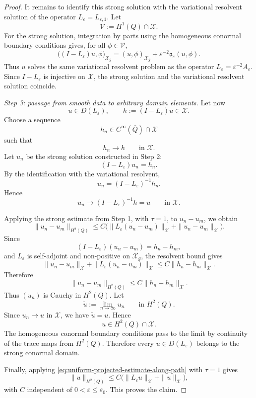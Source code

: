 \documentclass[11pt]{article}
\theoremstyle{definition}
\theoremstyle{remark}
\numberwithin{equation}{section}
\begin{document}
\begin{proof}
It remains to identify this strong solution with the variational resolvent
solution of the operator \(L_\varepsilon=L_{\varepsilon,1}\). Let
\[
\mathcal V:=H^1(Q)\cap\mathcal X .
\]
For the strong solution, integration by parts using the homogeneous conormal
boundary conditions gives, for all \(\phi\in\mathcal V\),
\[
\bigl((I-L_\varepsilon)u,\phi\bigr)_{\mathcal X_g}
=
(u,\phi)_{\mathcal X_g}
+
\varepsilon^{-2}\mathfrak a_\varepsilon(u,\phi).
\]
Thus \(u\) solves the same variational resolvent problem as the operator
\(L_\varepsilon=\varepsilon^{-2}A_\varepsilon\). Since \(I-L_\varepsilon\) is
injective on \(\mathcal X\), the strong solution and the variational
resolvent solution coincide.

\emph{Step 3: passage from smooth data to arbitrary domain elements.}
Let now
\[
u\in D(L_\varepsilon),
\qquad
h:=(I-L_\varepsilon)u\in\mathcal X.
\]
Choose a sequence
\[
h_n\in C^\infty(\overline Q)\cap\mathcal X
\]
such that
\[
h_n\to h
\qquad\text{in }\mathcal X.
\]
Let \(u_n\) be the strong solution constructed in Step 2:
\[
(I-L_\varepsilon)u_n=h_n.
\]
By the identification with the variational resolvent,
\[
u_n=(I-L_\varepsilon)^{-1}h_n.
\]
Hence
\[
u_n\to (I-L_\varepsilon)^{-1}h=u
\qquad\text{in }\mathcal X.
\]

Applying the strong estimate from Step 1, with \(\tau=1\), to
\(u_n-u_m\), we obtain
\[
\|u_n-u_m\|_{H^2(Q)}
\le
C\bigl(
\|L_\varepsilon(u_n-u_m)\|_{\mathcal X}
+
\|u_n-u_m\|_{\mathcal X}
\bigr).
\]
Since
\[
(I-L_\varepsilon)(u_n-u_m)=h_n-h_m,
\]
and \(L_\varepsilon\) is self-adjoint and non-positive on \(\mathcal X_g\),
the resolvent bound gives
\[
\|u_n-u_m\|_{\mathcal X}
+
\|L_\varepsilon(u_n-u_m)\|_{\mathcal X}
\le
C\|h_n-h_m\|_{\mathcal X}.
\]
Therefore
\[
\|u_n-u_m\|_{H^2(Q)}
\le
C\|h_n-h_m\|_{\mathcal X}.
\]
Thus \((u_n)\) is Cauchy in \(H^2(Q)\). Let
\[
\widetilde u:=\lim_{n\to\infty}u_n
\qquad\text{in }H^2(Q).
\]
Since \(u_n\to u\) in \(\mathcal X\), we have \(\widetilde u=u\). Hence
\[
u\in H^2(Q)\cap\mathcal X.
\]
The homogeneous conormal boundary conditions pass to the limit by continuity
of the trace maps from \(H^2(Q)\). Therefore every \(u\in D(L_\varepsilon)\)
belongs to the strong conormal domain.

Finally, applying \eqref{eq:uniform-projected-estimate-along-path} with
\(\tau=1\) gives
\[
\|u\|_{H^2(Q)}
\le
C\bigl(
\|L_\varepsilon u\|_{\mathcal X}
+
\|u\|_{\mathcal X}
\bigr),
\]
with \(C\) independent of \(0<\varepsilon\le\varepsilon_0\). This proves the
claim.
\end{proof}
\end{document}
